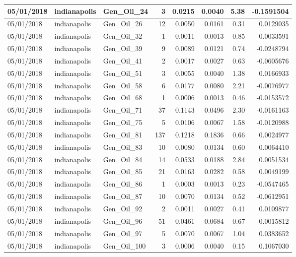 \documentclass[
  letterpaper,
  DIV=11,
  numbers=noendperiod]{scrartcl}
\begin{document}
\begin{tabular}{l|l|l|r|r|r|r|r}
\hline
05/01/2018 & indianapolis & Gen\_Oil\_24 & 3 & 0.0215 & 0.0040 & 5.38 & -0.1591504\\
\hline
05/01/2018 & indianapolis & Gen\_Oil\_26 & 12 & 0.0050 & 0.0161 & 0.31 & 0.0129035\\
\hline
05/01/2018 & indianapolis & Gen\_Oil\_32 & 1 & 0.0011 & 0.0013 & 0.85 & 0.0033591\\
\hline
05/01/2018 & indianapolis & Gen\_Oil\_39 & 9 & 0.0089 & 0.0121 & 0.74 & -0.0248794\\
\hline
05/01/2018 & indianapolis & Gen\_Oil\_41 & 2 & 0.0017 & 0.0027 & 0.63 & -0.0605676\\
\hline
05/01/2018 & indianapolis & Gen\_Oil\_51 & 3 & 0.0055 & 0.0040 & 1.38 & 0.0166933\\
\hline
05/01/2018 & indianapolis & Gen\_Oil\_58 & 6 & 0.0177 & 0.0080 & 2.21 & -0.0076977\\
\hline
05/01/2018 & indianapolis & Gen\_Oil\_68 & 1 & 0.0006 & 0.0013 & 0.46 & -0.0153572\\
\hline
05/01/2018 & indianapolis & Gen\_Oil\_71 & 37 & 0.1143 & 0.0496 & 2.30 & -0.0161163\\
\hline
05/01/2018 & indianapolis & Gen\_Oil\_75 & 5 & 0.0106 & 0.0067 & 1.58 & -0.0120988\\
\hline
05/01/2018 & indianapolis & Gen\_Oil\_81 & 137 & 0.1218 & 0.1836 & 0.66 & 0.0024977\\
\hline
05/01/2018 & indianapolis & Gen\_Oil\_83 & 10 & 0.0080 & 0.0134 & 0.60 & 0.0064410\\
\hline
05/01/2018 & indianapolis & Gen\_Oil\_84 & 14 & 0.0533 & 0.0188 & 2.84 & 0.0051534\\
\hline
05/01/2018 & indianapolis & Gen\_Oil\_85 & 21 & 0.0163 & 0.0282 & 0.58 & 0.0049199\\
\hline
05/01/2018 & indianapolis & Gen\_Oil\_86 & 1 & 0.0003 & 0.0013 & 0.23 & -0.0547465\\
\hline
05/01/2018 & indianapolis & Gen\_Oil\_87 & 10 & 0.0070 & 0.0134 & 0.52 & -0.0612951\\
\hline
05/01/2018 & indianapolis & Gen\_Oil\_92 & 2 & 0.0011 & 0.0027 & 0.41 & 0.0109877\\
\hline
05/01/2018 & indianapolis & Gen\_Oil\_96 & 51 & 0.0461 & 0.0684 & 0.67 & -0.0015812\\
\hline
05/01/2018 & indianapolis & Gen\_Oil\_97 & 5 & 0.0070 & 0.0067 & 1.04 & 0.0383652\\
\hline
05/01/2018 & indianapolis & Gen\_Oil\_100 & 3 & 0.0006 & 0.0040 & 0.15 & 0.1067030\\

\end{tabular}
\end{document}
